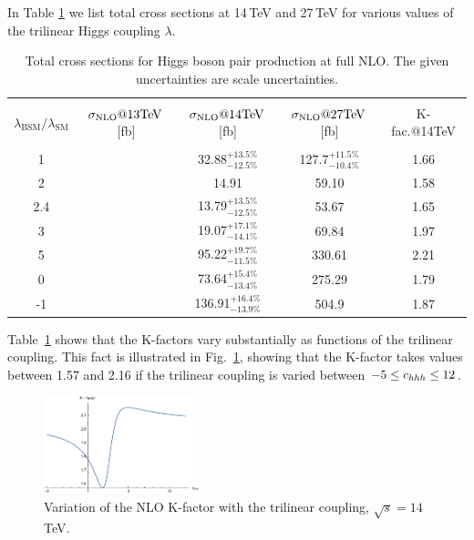 In Table \ref{tab:sigmatot} we list total cross sections at 14\,TeV and 27\,TeV for various values of the trilinear Higgs coupling $\lambda$. 
\begin{table}[htb]
\begin{center}
\begin{tabular}{| c | c | c |c|c|}
\hline
&&&&\\
$\lambda_{\mathrm{BSM}}/\lambda_{\mathrm{SM}}$ & $\sigma_{\rm{NLO}}@13 \mathrm{TeV}$\,[fb]& $\sigma_{\rm{NLO}}@14 \mathrm{TeV}$\,[fb] & $\sigma_{\rm{NLO}}@27 \mathrm{TeV}$\,[fb] &K-fac.@14TeV\\
&&&&\\
\hline
1& & 32.88$^{+13.5\%}_{-12.5\%}$&127.7$^{+11.5\%}_{-10.4\%}$ &1.66\\
\hline
2 & & 14.91 &  59.10 & 1.58 \\
\hline
2.4&  & 13.79$^{+13.5\%}_{-12.5\%}$& 53.67 & 1.65 \\
\hline
3& & 19.07$^{+17.1\%}_{-14.1\%}$ & 69.84 & 1.97 \\
\hline 
5&  & 95.22$^{+19.7\%}_{-11.5\%}$& 330.61 & 2.21 \\
\hline 
0& & 73.64$^{+15.4\%}_{-13.4\%}$& 275.29& 1.79  \\
\hline 
-1& & 136.91$^{+16.4\%}_{-13.9\%}$& 504.9 & 1.87 \\
\hline
\end{tabular}
\end{center}
\caption{Total cross sections for Higgs boson pair production at full NLO. The given uncertainties are scale uncertainties. 
\label{tab:sigmatot}}
\end{table}
Table~\ref{tab:sigmatot} shows that the K-factors vary substantially as functions of the trilinear coupling.
This fact is illustrated in Fig.~\ref{fig:Kfacvariation}, showing that the K-factor takes values between 1.57 and 2.16
if the trilinear coupling is varied between $-5\leq c_{hhh}\leq 12$.

\begin{figure}[htb]
  \centering
    \includegraphics[width=0.4\textwidth]{plots/Kfac_varlambda.pdf}
\caption{Variation of the NLO K-factor with the trilinear coupling, $\sqrt{s}=14$\,TeV.}
\label{fig:Kfacvariation}
\end{figure}


